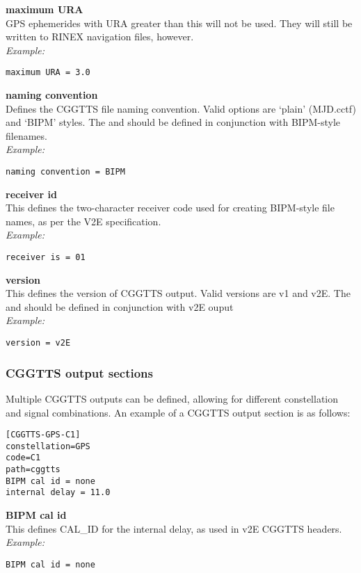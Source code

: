 {\bfseries maximum URA}\\
GPS ephemerides with URA greater than this will not be used. 
They will still be written to RINEX navigation files, however.\\
\textit{Example:}
\begin{lstlisting}
maximum URA = 3.0
\end{lstlisting}

{\bfseries naming convention}\\
Defines the CGGTTS file naming convention. Valid options are `plain' (MJD.cctf) and `BIPM' styles.
The  and  should be defined in conjunction with BIPM-style filenames.\\
\textit{Example:}
\begin{lstlisting}
naming convention = BIPM
\end{lstlisting}

{\bfseries receiver id}\\
This defines the two-character receiver code used for creating BIPM-style file names, 
as per the V2E specification.\\
\textit{Example:}
\begin{lstlisting}
receiver is = 01
\end{lstlisting}

{\bfseries version}\\
This defines the version of CGGTTS output. Valid versions are v1 and v2E. 
The  and  should be defined in conjunction with v2E ouput\\
\textit{Example:}
\begin{lstlisting}
version = v2E
\end{lstlisting}


\subsubsection{CGGTTS output sections}

Multiple CGGTTS outputs can be defined, allowing for different constellation and signal combinations.
An example of a CGGTTS output section is as follows:
\begin{lstlisting}
[CGGTTS-GPS-C1]
constellation=GPS
code=C1
path=cggtts
BIPM cal id = none
internal delay = 11.0
\end{lstlisting}

{\bfseries BIPM cal id}\\
This defines CAL\_ID for the internal delay, as used in v2E CGGTTS headers.\\
\textit{Example:}
\begin{lstlisting}
BIPM cal id = none
\end{lstlisting}

